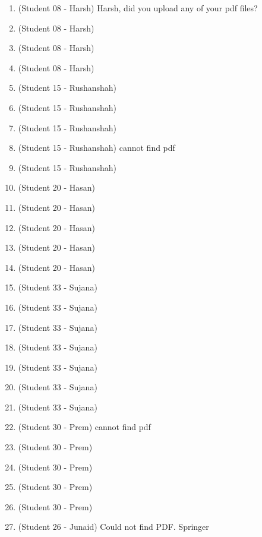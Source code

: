 \begin{enumerate}[label=\#\arabic*]
\item \cite{morita1988two} (Student 08 - Harsh)
Harsh, did you upload any of your pdf files?
\item \cite{etzion2007tilings} (Student 08 - Harsh)
\item \cite{vuylsteke1990range} (Student 08 - Harsh)
\item \cite{bomer1990perfect} (Student 08 - Harsh)
\item \cite{salvi2004pattern} (Student 15 - Rushanshah)
\item \cite{gu2023high} (Student 15 - Rushanshah)
\item \cite{farsangi2021rectification} (Student 15 - Rushanshah)
\item \cite{griffin1992generation} (Student 15 - Rushanshah) cannot find pdf
\item \cite{maurice2011pattern} (Student 15 - Rushanshah)
\item \cite{mitchell1994constructing} (Student 20 - Hasan)
\item \cite{hsieh2001decoding} (Student 20 - Hasan)
\item \cite{wei2022nearly} (Student 20 - Hasan)
\item \cite{kim2005generalized} (Student 20 - Hasan)
\item \cite{fan1989constructions} (Student 20 - Hasan)
\item \cite{savage1997survey} (Student 33 - Sujana)
\item \cite{stevens2014coolest} (Student 33 - Sujana)
\item \cite{voorhees2008remarks} (Student 33 - Sujana)
\item \cite{martinez2011reproducing} (Student 33 - Sujana)
\item \cite{klartag2024strongdataprocessinginequality} (Student 33 - Sujana)
\item \cite{barber2010binary} (Student 33 - Sujana)
\item \cite{benk2025binary} (Student 33 - Sujana)
\item \cite{etzion1990pseudo} (Student 30 - Prem) cannot find pdf
\item \cite{ivanyi2013prism} (Student 30 - Prem)
\item \cite{xu2007robust} (Student 30 - Prem)
\item \cite{blakley2000two} (Student 30 - Prem)
\item \cite{huang2014fast} (Student 30 - Prem)
\item \cite{heindl2023py} (Student 26 - Junaid) Could not find PDF. Springer

\end{enumerate}
